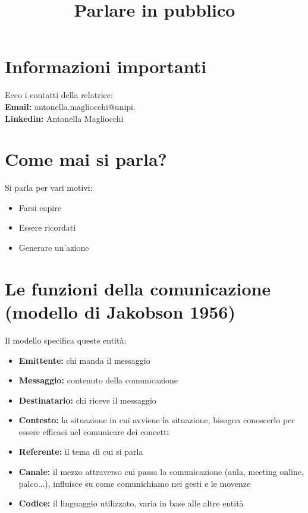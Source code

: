 \documentclass[12pt,a4paper]{article}
\title{Parlare in pubblico}
\author{}
\date{}
\let\oldsection\section
\renewcommand{\section}{\clearpage\oldsection}
\begin{document}
\maketitle
\tableofcontents

\section{Informazioni importanti}
Ecco i contatti della relatrice:\\
\textbf{Email:} antonella.magliocchi@unipi.\\
\textbf{Linkedin:} Antonella Magliocchi

\section{Come mai si parla?}
Si parla per vari motivi:
\begin{itemize}
    \item Farsi capire
    \item Essere ricordati
    \item Generare un'azione
\end{itemize}

\section{Le funzioni della comunicazione (modello di Jakobson 1956)}
Il modello specifica queste entità:
\begin{itemize}
    \item \textbf{Emittente:} chi manda il messaggio
    \item \textbf{Messaggio:} contenuto della comunicazione
    \item \textbf{Destinatario:} chi riceve il messaggio
    \item \textbf{Contesto:} la situazione in cui avviene la situazione, bisogna conoscerlo per essere efficaci nel comunicare dei concetti
    \item \textbf{Referente:} il tema di cui si parla
    \item \textbf{Canale:} il mezzo attraverso cui passa la comunicazione (aula, meeting online, palco...), influisce su come comunichiamo nei gesti e le movenze
    \item \textbf{Codice:} il linguaggio utilizzato, varia in base alle altre entità
\end{itemize}
\end{document}
